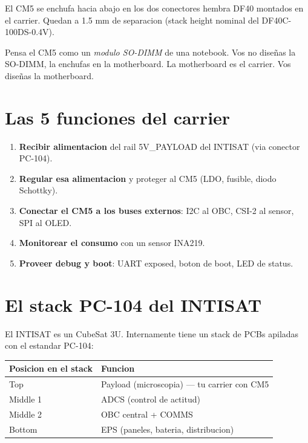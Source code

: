 \documentclass[11pt,a4paper,oneside,openright]{book}
\begin{document}
El CM5 se enchufa hacia abajo en los dos conectores hembra DF40 montados
en el carrier. Quedan a 1.5 mm de separacion (stack height nominal del
DF40C-100DS-0.4V).

\begin{intuibox}
Pensa el CM5 como un \emph{modulo SO-DIMM} de una notebook. Vos no diseñas
la SO-DIMM, la enchufas en la motherboard. La motherboard es el carrier.
Vos diseñas la motherboard.
\end{intuibox}

\section{Las 5 funciones del carrier}

\begin{enumerate}[leftmargin=2em]
  \item \textbf{Recibir alimentacion} del rail 5V\_PAYLOAD del INTISAT
        (via conector PC-104).
  \item \textbf{Regular esa alimentacion} y proteger al CM5 (LDO, fusible,
        diodo Schottky).
  \item \textbf{Conectar el CM5 a los buses externos}: I2C al OBC, CSI-2 al
        sensor, SPI al OLED.
  \item \textbf{Monitorear el consumo} con un sensor INA219.
  \item \textbf{Proveer debug y boot}: UART exposed, boton de boot, LED de
        status.
\end{enumerate}

\section{El stack PC-104 del INTISAT}

El INTISAT es un CubeSat 3U. Internamente tiene un stack de PCBs apiladas
con el estandar PC-104:

\begin{center}
\begin{tabular}{ll}
\toprule
\textbf{Posicion en el stack} & \textbf{Funcion} \\
\midrule
Top      & Payload (microscopia) --- tu carrier con CM5 \\
Middle 1 & ADCS (control de actitud) \\
Middle 2 & OBC central + COMMS \\
Bottom   & EPS (paneles, bateria, distribucion) \\
\bottomrule
\end{tabular}
\end{center}
\end{document}
